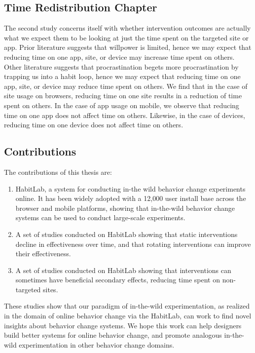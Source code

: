 \subsection{Time Redistribution Chapter}

The second study concerns itself with whether intervention outcomes are actually what we expect them to be looking at just the time spent on the targeted site or app. Prior literature suggests that willpower is limited, hence we may expect that reducing time on one app, site, or device may increase time spent on others. Other literature suggests that procrastination begets more procrastination by trapping us into a habit loop, hence we may expect that reducing time on one app, site, or device may reduce time spent on others. We find that in the case of site usage on browsers, reducing time on one site results in a reduction of time spent on others. In the case of app usage on mobile, we observe that reducing time on one app does not affect time on others. Likewise, in the case of devices, reducing time on one device does not affect time on others.


\subsection{Contributions}

The contributions of this thesis are:

\begin{enumerate}
\item HabitLab, a system for conducting in-the wild behavior change experiments online. It has been widely adopted with a 12,000 user install base across the browser and mobile platforms, showing that in-the-wild behavior change systems can be used to conduct large-scale experiments.
\item A set of studies conducted on HabitLab showing that static interventions decline in effectiveness over time, and that rotating interventions can improve their effectiveness.
\item A set of studies conducted on HabitLab showing that interventions can sometimes have beneficial secondary effects, reducing time spent on non-targeted sites.
\end{enumerate}


These studies show that our paradigm of in-the-wild experimentation, as realized in the domain of online behavior change via the HabitLab, can work to find novel insights about behavior change systems. We hope this work can help designers build better systems for online behavior change, and promote analogous in-the-wild experimentation in other behavior change domains.



